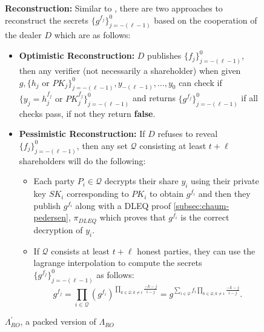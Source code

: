 \begin{figure}[H]
{\begin{tcolorbox}[title=\textbf{$\Lambda_{RO}^{'}$}, width=1.2\textwidth, colframe=blue!75!black, colback=blue!10, sharp corners]
        \vspace{0.5em}
        \textbf{Reconstruction:}
            Similar to \cite{cryptoeprint:2025/576}, there are two approaches to reconstruct the secrets 
            $\{g^{f_j}\}_{j=-(\ell-1)}^0$ based on the cooperation of the dealer $D$ which are as follows:
            \begin{itemize}
                \item \textbf{Optimistic Reconstruction:} $D$ publishes $\{f_j\}_{j=-(\ell-1)}^0$, then any verifier (not necessarily a shareholder) 
                when given $g,\{h_j\text{ or }PK_j\}_{j=-(\ell-1)}^0,y_{-(\ell-1)},\dots,y_0$ can check if $\{y_j=h_j^{f_j}\text{ or }PK_j^{f_j}\}_{j=-(\ell-1)}^0$ 
                and returns $\{g^{f_j}\}_{j=-(\ell-1)}^0$ if all checks pass, if not they return \textbf{false}.
                \item \textbf{Pessimistic Reconstruction:} If $D$ refuses to reveal $\{f_j\}_{j=-(\ell-1)}^0$, then any set 
                $\mathcal{Q}$ consisting at least $t+\ell$ shareholders will do the following:
                \begin{itemize}
                    \item Each party $P_i\in\mathcal{Q}$ decrypts their share $y_i$ using their private key $SK_i$ 
                      corresponding to $PK_i$ to obtain $g^{f_i}$ and then they publish $g^{f_i}$ 
                      along with a DLEQ proof \ref{subsec:chaum-pedersen}, $\pi_{DLEQ}$ which proves that 
                      $g^{f_i}$ is the correct decryption of $y_i$.
                    \item If $\mathcal{Q}$ consists at least $t+\ell$ honest parties, they can use the 
                    lagrange interpolation to compute the secrets $\{g^{f_j}\}_{j=-(\ell-1)}^0$ as follows:
                      $$ \textstyle  g^{f_j} = \prod_{i\in\mathcal{Q}}(g^{f_i})^{\prod_{k\in\mathcal{Q},k\neq i}\frac{-k-j}{i-j}}= g^{\sum_{i\in\mathcal{Q}}f_i\prod_{k\in\mathcal{Q},k\neq i}\frac{-k-j}{i-j}}.$$
                \end{itemize}
            \end{itemize}
    \end{tcolorbox}
    }
    \caption[PPPVSS]{$\Lambda_{RO}^{'}$, a packed version of $\Lambda_{RO}$ \cite{cryptoeprint:2025/576}}
    \label{fig:initial-packed-shamir-PPPVSS-ro}
\end{figure}